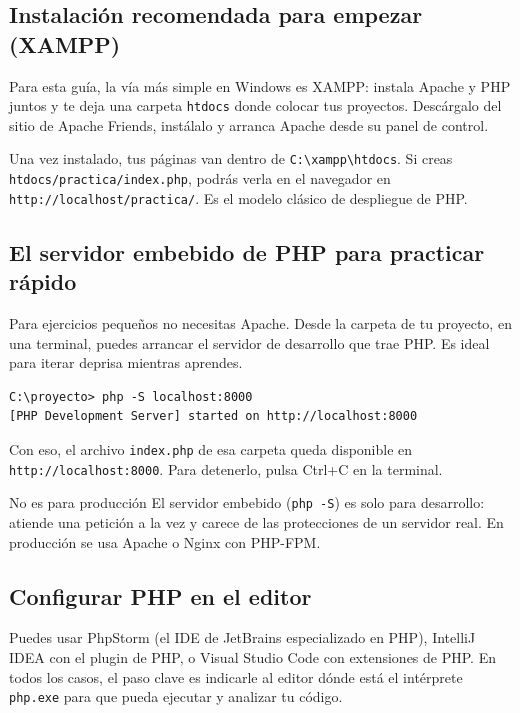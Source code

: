 \documentclass[11pt]{article}
\begin{document}
\subsection{Instalación recomendada para empezar (XAMPP)}
Para esta guía, la vía más simple en Windows es XAMPP: instala Apache y PHP juntos y te deja una carpeta \texttt{htdocs} donde colocar tus proyectos. Descárgalo del sitio de Apache Friends, instálalo y arranca Apache desde su panel de control.

Una vez instalado, tus páginas van dentro de \texttt{C:\allowbreak{}\textbackslash{}xampp\textbackslash{}htdocs}. Si creas \texttt{htdocs/\allowbreak{}practica/\allowbreak{}index.\allowbreak{}php}, podrás verla en el navegador en \texttt{http:\allowbreak{}/\allowbreak{}/\allowbreak{}localhost/\allowbreak{}practica/\allowbreak{}}. Es el modelo clásico de despliegue de PHP.

\subsection{El servidor embebido de PHP para practicar rápido}
Para ejercicios pequeños no necesitas Apache. Desde la carpeta de tu proyecto, en una terminal, puedes arrancar el servidor de desarrollo que trae PHP. Es ideal para iterar deprisa mientras aprendes.

\begin{cajacodigo}
\begin{lstlisting}[style=markup]
C:\proyecto> php -S localhost:8000
[PHP Development Server] started on http://localhost:8000
\end{lstlisting}
\end{cajacodigo}
\vspace{2pt}
Con eso, el archivo \texttt{index.\allowbreak{}php} de esa carpeta queda disponible en \texttt{http:\allowbreak{}/\allowbreak{}/\allowbreak{}localhost:\allowbreak{}8000}. Para detenerlo, pulsa Ctrl+C en la terminal.

\begin{cajawarn}{No es para producción}
El servidor embebido (\texttt{php -S}) es solo para desarrollo: atiende una petición a la vez y carece de las protecciones de un servidor real. En producción se usa Apache o Nginx con PHP-FPM.\par
\end{cajawarn}
\subsection{Configurar PHP en el editor}
Puedes usar PhpStorm (el IDE de JetBrains especializado en PHP), IntelliJ IDEA con el plugin de PHP, o Visual Studio Code con extensiones de PHP. En todos los casos, el paso clave es indicarle al editor dónde está el intérprete \texttt{php.\allowbreak{}exe} para que pueda ejecutar y analizar tu código.
\end{document}
